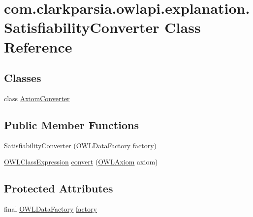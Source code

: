 \hypertarget{classcom_1_1clarkparsia_1_1owlapi_1_1explanation_1_1_satisfiability_converter}{\section{com.\-clarkparsia.\-owlapi.\-explanation.\-Satisfiability\-Converter Class Reference}
\label{classcom_1_1clarkparsia_1_1owlapi_1_1explanation_1_1_satisfiability_converter}
}
\subsection*{Classes}
\begin{DoxyCompactItemize}
\item 
class \hyperlink{classcom_1_1clarkparsia_1_1owlapi_1_1explanation_1_1_satisfiability_converter_1_1_axiom_converter}{Axiom\-Converter}
\end{DoxyCompactItemize}
\subsection*{Public Member Functions}
\begin{DoxyCompactItemize}
\item 
\hyperlink{classcom_1_1clarkparsia_1_1owlapi_1_1explanation_1_1_satisfiability_converter_aad1057642b82c26d5da596ef30f70f1f}{Satisfiability\-Converter} (\hyperlink{interfaceorg_1_1semanticweb_1_1owlapi_1_1model_1_1_o_w_l_data_factory}{O\-W\-L\-Data\-Factory} \hyperlink{classcom_1_1clarkparsia_1_1owlapi_1_1explanation_1_1_satisfiability_converter_a7375c37da49dea24b29e58b43d61bb56}{factory})
\item 
\hyperlink{interfaceorg_1_1semanticweb_1_1owlapi_1_1model_1_1_o_w_l_class_expression}{O\-W\-L\-Class\-Expression} \hyperlink{classcom_1_1clarkparsia_1_1owlapi_1_1explanation_1_1_satisfiability_converter_adb2e9d8fe5d06502336b2991d4043cc3}{convert} (\hyperlink{interfaceorg_1_1semanticweb_1_1owlapi_1_1model_1_1_o_w_l_axiom}{O\-W\-L\-Axiom} axiom)
\end{DoxyCompactItemize}
\subsection*{Protected Attributes}
\begin{DoxyCompactItemize}
\item 
final \hyperlink{interfaceorg_1_1semanticweb_1_1owlapi_1_1model_1_1_o_w_l_data_factory}{O\-W\-L\-Data\-Factory} \hyperlink{classcom_1_1clarkparsia_1_1owlapi_1_1explanation_1_1_satisfiability_converter_a7375c37da49dea24b29e58b43d61bb56}{factory}
\end{DoxyCompactItemize}
